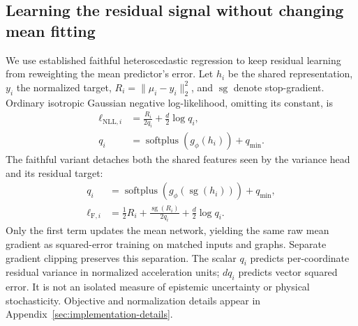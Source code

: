 \subsection{Learning the residual signal without changing mean fitting}
We use established faithful heteroscedastic regression \citep{stirn2023} to keep residual learning from reweighting the mean predictor's error. Let $h_i$ be the shared representation, $y_i$ the normalized target, $R_i=\|\mu_i-y_i\|_2^2$, and $\operatorname{sg}$ denote stop-gradient. Ordinary isotropic Gaussian negative log-likelihood, omitting its constant, is
\begin{align}
 \ell_{\mathrm{NLL},i}&=\frac{R_i}{2q_i}+\frac d2\log q_i,\nonumber\\
 q_i&=\operatorname{softplus}(g_\phi(h_i))+q_{\min}.
 \label{eq:nll}
\end{align}
The faithful variant detaches both the shared features seen by the variance head and its residual target:
\begin{align}
 q_i&=\operatorname{softplus}(g_\phi(\operatorname{sg}(h_i)))+q_{\min},\nonumber\\
 \ell_{\mathrm F,i}&=\tfrac12R_i+
 \frac{\operatorname{sg}(R_i)}{2q_i}+\frac d2\log q_i.
 \label{eq:faithful}
\end{align}
Only the first term updates the mean network, yielding the same raw mean gradient as squared-error training on matched inputs and graphs. Separate gradient clipping preserves this separation. The scalar $q_i$ predicts per-coordinate residual variance in normalized acceleration units; $dq_i$ predicts vector squared error. It is not an isolated measure of epistemic uncertainty or physical stochasticity. Objective and normalization details appear in Appendix~\ref{sec:implementation-details}.
